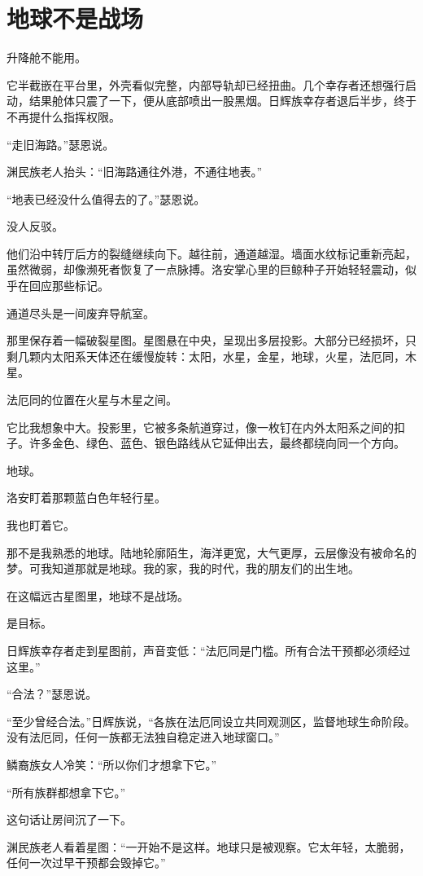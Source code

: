 \chapter{地球不是战场}

升降舱不能用。

它半截嵌在平台里，外壳看似完整，内部导轨却已经扭曲。几个幸存者还想强行启动，结果舱体只震了一下，便从底部喷出一股黑烟。日辉族幸存者退后半步，终于不再提什么指挥权限。

“走旧海路。”瑟恩说。

渊民族老人抬头：“旧海路通往外港，不通往地表。”

“地表已经没什么值得去的了。”瑟恩说。

没人反驳。

他们沿中转厅后方的裂缝继续向下。越往前，通道越湿。墙面水纹标记重新亮起，虽然微弱，却像濒死者恢复了一点脉搏。洛安掌心里的巨鲸种子开始轻轻震动，似乎在回应那些标记。

通道尽头是一间废弃导航室。

那里保存着一幅破裂星图。星图悬在中央，呈现出多层投影。大部分已经损坏，只剩几颗内太阳系天体还在缓慢旋转：太阳，水星，金星，地球，火星，法厄同，木星。

法厄同的位置在火星与木星之间。

它比我想象中大。投影里，它被多条航道穿过，像一枚钉在内外太阳系之间的扣子。许多金色、绿色、蓝色、银色路线从它延伸出去，最终都绕向同一个方向。

地球。

洛安盯着那颗蓝白色年轻行星。

我也盯着它。

那不是我熟悉的地球。陆地轮廓陌生，海洋更宽，大气更厚，云层像没有被命名的梦。可我知道那就是地球。我的家，我的时代，我的朋友们的出生地。

在这幅远古星图里，地球不是战场。

是目标。

日辉族幸存者走到星图前，声音变低：“法厄同是门槛。所有合法干预都必须经过这里。”

“合法？”瑟恩说。

“至少曾经合法。”日辉族说，“各族在法厄同设立共同观测区，监督地球生命阶段。没有法厄同，任何一族都无法独自稳定进入地球窗口。”

鳞裔族女人冷笑：“所以你们才想拿下它。”

“所有族群都想拿下它。”

这句话让房间沉了一下。

渊民族老人看着星图：“一开始不是这样。地球只是被观察。它太年轻，太脆弱，任何一次过早干预都会毁掉它。”

